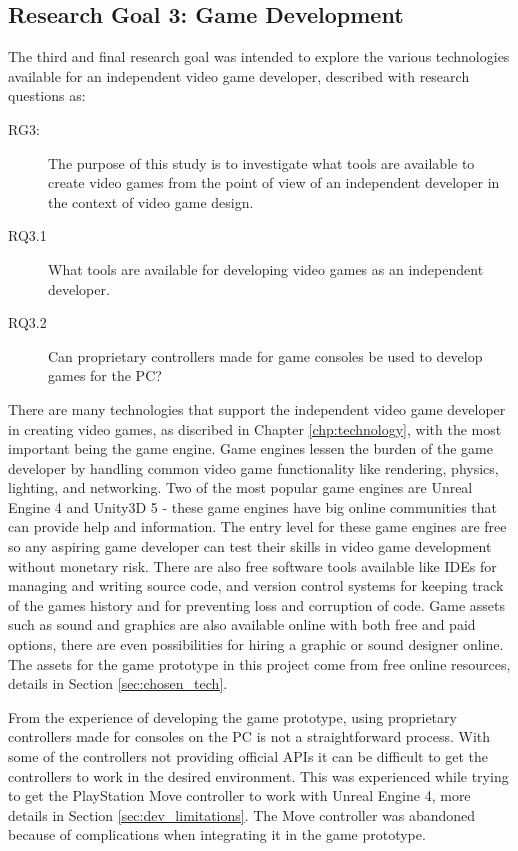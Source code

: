 \subsection{Research Goal 3: Game Development}
The third and final research goal was intended to explore the various technologies available for an independent video game developer, described with research questions as:
\begin{description}
	\item[RG3:] The purpose of this study is to investigate what tools are available to create video games from the point of view of an independent developer in the context of video game design. 
	\item[RQ3.1] What tools are available for developing video games as an independent developer.
	\item[RQ3.2] Can proprietary controllers made for game consoles be used to develop games for the PC?
\end{description}
There are many technologies that support the independent video game developer in creating video games, as discribed in Chapter \ref{chp:technology}, with the most important being the game engine. Game engines lessen the burden of the game developer by handling common video game functionality like rendering, physics, lighting, and networking. Two of the most popular game engines are Unreal Engine 4 and Unity3D 5 - these game engines have big online communities that can provide help and information. The entry level for these game engines are free so any aspiring game developer can test their skills in video game development without monetary risk. There are also free software tools available like IDEs for managing and writing source code, and version control systems for keeping track of the games history and for preventing loss and corruption of code. Game assets such as sound and graphics are also available online with both free and paid options, there are even possibilities for hiring a graphic or sound designer online. The assets for the game prototype in this project come from free online resources, details in Section \ref{sec:chosen_tech}.

From the experience of developing the game prototype, using proprietary controllers made for consoles on the PC is not a straightforward process. With some of the controllers not providing official APIs it can be difficult to get the controllers to work in the desired environment. This was experienced while trying to get the PlayStation Move controller to work with Unreal Engine 4, more details in Section \ref{sec:dev_limitations}. The Move controller was abandoned because of complications when integrating it in the game prototype. 
	
